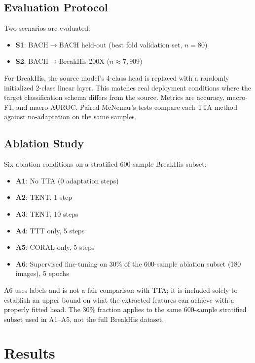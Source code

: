 \documentclass[conference]{IEEEtran}
\begin{document}
\subsection{Evaluation Protocol}

Two scenarios are evaluated:
\begin{itemize}
    \item \textbf{S1}: BACH$\rightarrow$BACH held-out (best fold validation set, $n=80$)
    \item \textbf{S2}: BACH$\rightarrow$BreakHis 200X ($n \approx 7{,}909$)
\end{itemize}

For BreakHis, the source model's 4-class head is replaced with a randomly initialized 2-class linear layer. This matches real deployment conditions where the target classification schema differs from the source. Metrics are accuracy, macro-F1, and macro-AUROC. Paired McNemar's tests compare each TTA method against no-adaptation on the same samples.

\subsection{Ablation Study}

Six ablation conditions on a stratified 600-sample BreakHis subset:

\begin{itemize}
    \item \textbf{A1}: No TTA (0 adaptation steps)
    \item \textbf{A2}: TENT, 1 step
    \item \textbf{A3}: TENT, 10 steps
    \item \textbf{A4}: TTT only, 5 steps
    \item \textbf{A5}: CORAL only, 5 steps
    \item \textbf{A6}: Supervised fine-tuning on 30\% of the 600-sample ablation subset (180 images), 5 epochs
\end{itemize}

A6 uses labels and is not a fair comparison with TTA; it is included solely to establish an upper bound on what the extracted features can achieve with a properly fitted head. The 30\% fraction applies to the same 600-sample stratified subset used in A1--A5, not the full BreakHis dataset.

\section{Results}
\label{sec:results}
\end{document}
